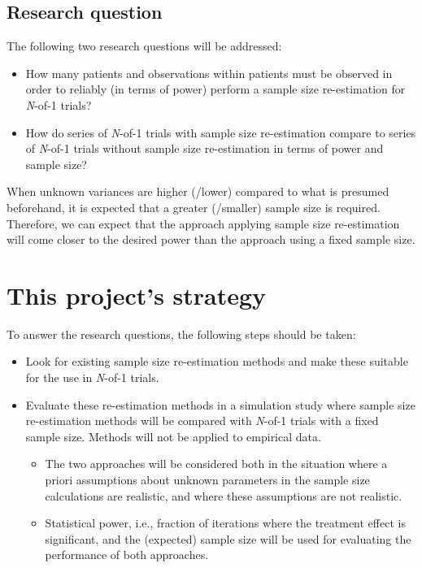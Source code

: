 \documentclass[11pt]{article}
\begin{document}
\subsection{Research question}
The following two research questions will be addressed:
\begin{itemize}
    \item How many patients and observations within patients must be observed in order to reliably (in terms of power) perform a sample size re-estimation for \textit{N}-of-1 trials?
    \item How do series of \textit{N}-of-1 trials with sample size re-estimation compare to series of \textit{N}-of-1 trials without sample size re-estimation in terms of power and sample size?
\end{itemize} \par

\noindent When unknown variances are higher (/lower) compared to what is presumed beforehand, it is expected that a greater (/smaller) sample size is required. Therefore, we can expect that the approach applying sample size re-estimation will come closer to the desired power than the approach using a fixed sample size. 


\section{This project's strategy}
To answer the research questions, the following steps should be taken:
\begin{itemize}
    \item Look for existing sample size re-estimation methods and make these suitable for the use in \textit{N}-of-1 trials.
    \item Evaluate these re-estimation methods in a simulation study where sample size re-estimation methods will be compared with \textit{N}-of-1 trials with a fixed sample size. Methods will not be applied to empirical data. 
    \begin{itemize}
    \item The two approaches will be considered both in the situation where a priori assumptions about unknown parameters in the sample size calculations are realistic, and where these assumptions are not realistic. 
    \item Statistical power, i.e., fraction of iterations where the treatment effect is significant, and the (expected) sample size will be used for evaluating the performance of both approaches.  
    \end{itemize}
\end{itemize}
\end{document}
